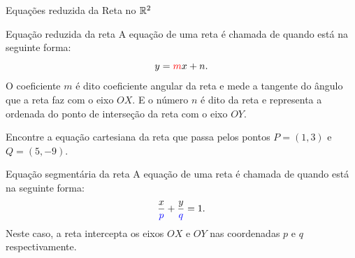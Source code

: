 \begin{frame}[label=retas]{Equações reduzida da Reta no \(\mathbb{R}^2\)}
	\begin{block}{Equação reduzida da reta}
		A equação de uma reta é chamada de    quando  está na seguinte forma:
		\[y={\color{red}m}x+n.\]
		O coeficiente  {\color{blue}\(m\)} é dito {\color{red}coeficiente angular} da reta e mede a tangente do ângulo que a reta faz com o eixo $OX$. E o número $n$ é dito  da reta e representa a ordenada do ponto de interseção da reta com o eixo $OY$.
	\end{block}

	\begin{exe}\noindent
  Encontre a equação cartesiana da reta que passa pelos pontos $P=(1,3)$ e $Q=(5,-9)$.
	\end{exe}

\end{frame}

\begin{frame}
	
	\begin{block}{Equação segmentária da reta}
		A equação de uma reta é chamada de     quando  está na seguinte forma:
		\[\frac{x}{{\color{blue}p}}+\frac{y}{{\color{blue}q}}=1.\]
		Neste caso, a reta intercepta os eixos $OX$ e $OY$ nas coordenadas {\color{blue}$p$} e {\color{blue}$q$} respectivamente. 
	\end{block}
	
\end{frame}

